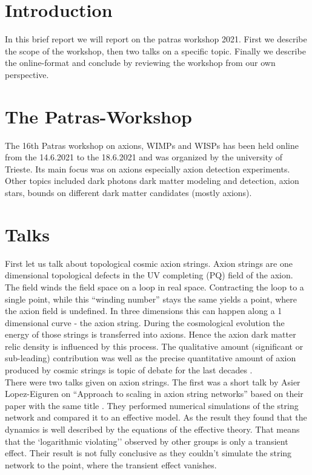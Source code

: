 \documentclass[a4paper]{article}
\begin{document}
\section{Introduction}
In this brief report we will report on the patras workshop 2021.
First we describe the scope of the workshop, then two talks on a specific topic.
Finally we describe the online-format and conclude by reviewing the workshop from our own perspective.

\section{The Patras-Workshop}
The 16th Patras workshop on axions, WIMPs and WISPs has been held online from the 14.6.2021 to the 18.6.2021 and was organized by the university of Trieste.
Its main focus was on axions especially axion detection experiments.
Other topics included dark photons dark matter modeling and
detection,  axion stars,  bounds on different dark matter candidates (mostly axions).

\section{Talks}
First let us talk about topological cosmic axion strings.
Axion strings are one dimensional topological defects in the UV completing
(PQ) field of the axion. The field winds the field space on a loop
in real space. Contracting the loop to a single point, while this ``winding number'' stays the same yields a point, where the axion field is undefined. In three dimensions this can happen along a 1 dimensional curve - the axion string.
During the cosmological evolution the energy of those strings is transferred into axions.
Hence the axion dark matter relic density is influenced by this process.
The qualitative amount (significant or sub-leading) contribution was well as the precise quantitative amount
of axion produced by cosmic strings is topic of debate for the last decades \cite{Gorghetto_2018}. \\


\noindent
There were two talks given on axion strings.
The first was a short talk by Asier Lopez-Eiguren on ``Approach to scaling in axion string networks'' based on their paper with the same title \cite{Hindmarsh_2021}.
They performed numerical simulations of the string network and compared it to an effective
model. As the result they found that the dynamics is well described by the equations of the effective theory. That means that the `logarithmic violating'' observed by other groups is only a transient effect.
Their result is not fully conclusive as they couldn't simulate the string network to the point, where
the transient effect vanishes. \\
\end{document}
